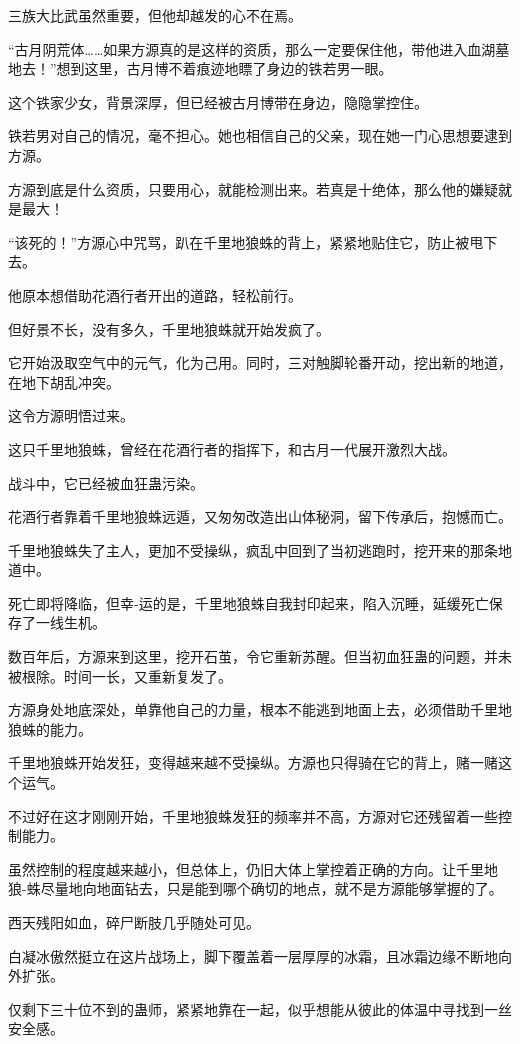 \begin{this_body}
三族大比武虽然重要，但他却越发的心不在焉。

“古月阴荒体……如果方源真的是这样的资质，那么一定要保住他，带他进入血湖墓地去！”想到这里，古月博不着痕迹地瞟了身边的铁若男一眼。

这个铁家少女，背景深厚，但已经被古月博带在身边，隐隐掌控住。

铁若男对自己的情况，毫不担心。她也相信自己的父亲，现在她一门心思想要逮到方源。

方源到底是什么资质，只要用心，就能检测出来。若真是十绝体，那么他的嫌疑就是最大！

“该死的！”方源心中咒骂，趴在千里地狼蛛的背上，紧紧地贴住它，防止被甩下去。

他原本想借助花酒行者开出的道路，轻松前行。

但好景不长，没有多久，千里地狼蛛就开始发疯了。

它开始汲取空气中的元气，化为己用。同时，三对触脚轮番开动，挖出新的地道，在地下胡乱冲突。

这令方源明悟过来。

这只千里地狼蛛，曾经在花酒行者的指挥下，和古月一代展开激烈大战。

战斗中，它已经被血狂蛊污染。

花酒行者靠着千里地狼蛛远遁，又匆匆改造出山体秘洞，留下传承后，抱憾而亡。

千里地狼蛛失了主人，更加不受操纵，疯乱中回到了当初逃跑时，挖开来的那条地道中。

死亡即将降临，但幸-运的是，千里地狼蛛自我封印起来，陷入沉睡，延缓死亡保存了一线生机。

数百年后，方源来到这里，挖开石茧，令它重新苏醒。但当初血狂蛊的问题，并未被根除。时间一长，又重新复发了。

方源身处地底深处，单靠他自己的力量，根本不能逃到地面上去，必须借助千里地狼蛛的能力。

千里地狼蛛开始发狂，变得越来越不受操纵。方源也只得骑在它的背上，赌一赌这个运气。

不过好在这才刚刚开始，千里地狼蛛发狂的频率并不高，方源对它还残留着一些控制能力。

虽然控制的程度越来越小，但总体上，仍旧大体上掌控着正确的方向。让千里地狼-蛛尽量地向地面钻去，只是能到哪个确切的地点，就不是方源能够掌握的了。

西天残阳如血，碎尸断肢几乎随处可见。

白凝冰傲然挺立在这片战场上，脚下覆盖着一层厚厚的冰霜，且冰霜边缘不断地向外扩张。

仅剩下三十位不到的蛊师，紧紧地靠在一起，似乎想能从彼此的体温中寻找到一丝安全感。


\end{this_body}

